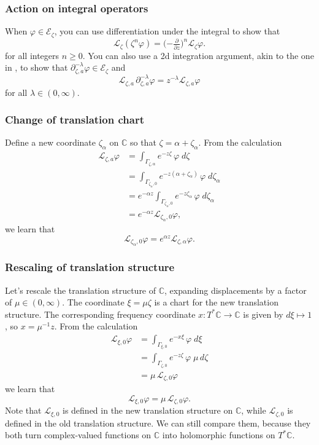 \documentclass{article}
\theoremstyle{definition}
\newcommand{\maps}{\colon}
\newcommand{\C}{\mathbb{C}}
\newcommand{\fracderiv}[3]{\partial^{#1}_{#2, #3}}
\newcommand{\laplace}{\mathcal{L}}
\begin{document}
\subsubsection{Action on integral operators}\label{L-int-op}
When $\varphi \in \mathcal{E}_\zeta$, you can use differentiation under the integral to show that~\cite[Theorem~1.34]{laplace-tfm}
\begin{equation}%
\laplace_\zeta (\zeta^n \varphi) = \big({-\tfrac{\partial}{\partial z}}\big)^n \laplace_\zeta \varphi.
\end{equation}
for all integers $n \ge 0$. You can also use a 2d integration argument, akin to the one in \cite[Theorem~2.39]{laplace-tfm}, to show that $\fracderiv{-\lambda}{\zeta}{a} \varphi \in \mathcal{E}_\zeta$ and
\[ \laplace_{\zeta, a}\,\fracderiv{-\lambda}{\zeta}{a} \varphi = z^{-\lambda} \laplace_{\zeta, a} \varphi \]
for all $\lambda \in (0, \infty)$.
\subsubsection{Change of translation chart}\label{translation}
Define a new coordinate $\zeta_\alpha$ on $\C$ so that $\zeta = \alpha + \zeta_\alpha$. From the calculation
\begin{align*}
\laplace_{\zeta, a} \varphi & = \int_{\Gamma_{\zeta, \alpha}} e^{-z \zeta}\,\varphi\;d\zeta \\
& = \int_{\Gamma_{\zeta_\alpha, 0}} e^{-z(\alpha + \zeta_\alpha)}\,\varphi\;d\zeta_\alpha \\
& = e^{-\alpha z} \int_{\Gamma_{\zeta_\alpha, 0}} e^{-z\zeta_\alpha}\,\varphi\;d\zeta_\alpha \\
& = e^{-\alpha z} \laplace_{\zeta_\alpha, 0} \varphi,
\end{align*}
we learn that
\[ \laplace_{\zeta_\alpha, 0} \varphi = e^{\alpha z} \laplace_{\zeta, \alpha} \varphi. \]



\subsubsection{Rescaling of translation structure}
Let's rescale the translation structure of $\C$, expanding displacements by a factor of $\mu \in (0, \infty)$. The coordinate $\xi = \mu\zeta$ is a chart for the new translation structure. The corresponding frequency coordinate $x \maps T^*\C \to \C$ is given by $d\xi \mapsto 1$, so $x = \mu^{-1} z$. From the calculation
\begin{align*}
\laplace_{\xi, 0} \varphi & = \int_{\Gamma_{\xi, 0}} e^{-x\xi}\,\varphi\;d\xi \\
& = \int_{\Gamma_{\zeta, 0}} e^{-z \zeta}\,\varphi\;\mu\,d\zeta \\
& = \mu\,\laplace_{\zeta, 0} \varphi
\end{align*}
we learn that
\[ \laplace_{\xi, 0} \varphi = \mu\,\laplace_{\zeta, 0} \varphi. \]
Note that $\laplace_{\xi, 0}$ is defined in the new translation structure on $\C$, while $\laplace_{\zeta, 0}$ is defined in the old translation structure. We can still compare them, because they both turn complex-valued functions on $\C$ into holomorphic functions on $T^*\C$.
\color{gray}
\end{document}
